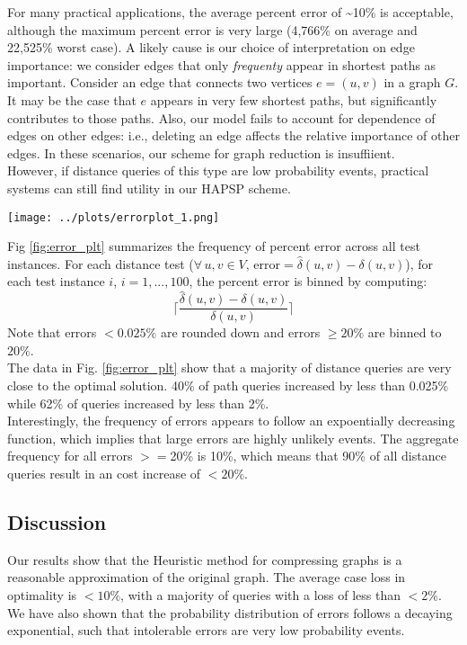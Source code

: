 \documentclass[10.5pt,journal]{IEEEtran}
\begin{document}
		For many practical applications, the average percent error of \textasciitilde10\% is acceptable,
		although the maximum percent error is very large (4,766\% on average and 22,525\% worst case).
		A likely cause is our choice of interpretation on edge importance: we consider edges that only
		{\it{frequenty}} appear in shortest paths as important. Consider an edge that connects two
		vertices $e=(u,v)$ in a graph $G$. It may be the case that $e$ appears in very few shortest paths,
		but significantly contributes to those paths. Also, our model fails to account for dependence of
		edges on other edges: i.e., deleting an edge affects the relative importance of other edges.
		In these scenarios, our scheme for graph reduction is insuffiient. \\
		
		However, if distance queries of this type are low probability events, practical systems can
		still find utility in our HAPSP scheme. \\
		
		\begin{figure*}[] \centering
		\texttt{[image: ../plots/errorplot\_1.png]} 
		\caption{Solution quality of HAPSP vs APSP}
		\label{fig:error_plt}
		\end{figure*}
		
		Fig \ref{fig:error_plt} summarizes the frequency of percent error across all test instances. 
		For each distance test ($\forall\, u,v\in V,\,\mbox{error} = \hat{\delta}(u,v) - \delta(u,v)$),
		for each test instance $i$, $i = 1,...,100$, the percent error is binned by computing:
			\[\lceil\frac{\hat{\delta}(u,v) - \delta(u,v)}{ \delta(u,v)}\rceil\]
		Note that errors $< 0.025\%$ are rounded down and errors $\ge 20\%$ are binned to $20\%$.\\
		
		The data in Fig. \ref{fig:error_plt} show that a majority of distance queries are very close
		to the optimal solution. 40\% of path queries increased by less than 0.025\% while 62\% of
		queries increased by less than 2\%. \\
		
		Interestingly, the frequency of errors appears to follow an expoentially decreasing function,
		which implies that large errors are highly unlikely events. The aggregate frequency for all
		errors $>=$20\% is 10\%, which means that 90\% of all distance queries result in an cost
		increase of $<20\%$.
	
	\subsection{Discussion}
		Our results show that the Heuristic method for compressing graphs is a reasonable approximation
		of the original graph. The average case loss in optimality is $<10\%$, with a majority of
		queries with a loss of less than $<2\%$. We have also shown that the probability distribution
		of errors follows a decaying exponential, such that intolerable errors are very low probability
		events.\\
		
\end{document}
